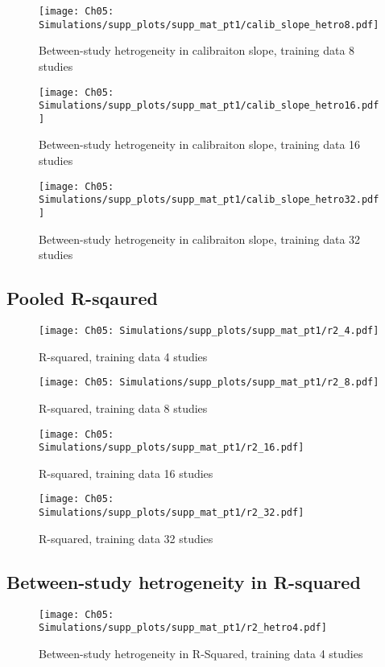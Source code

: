 \begin{figure}[H]
  \centering
  \texttt{[image: Ch05: Simulations/supp\_plots/supp\_mat\_pt1/calib\_slope\_hetro8.pdf]}
  \caption{Between-study hetrogeneity in calibraiton slope, training data 8 studies}
\end{figure}

\begin{figure}[H]
  \centering
  \texttt{[image: Ch05: Simulations/supp\_plots/supp\_mat\_pt1/calib\_slope\_hetro16.pdf]}
  \caption{Between-study hetrogeneity in calibraiton slope, training data 16 studies}
\end{figure}

\begin{figure}[H]
  \centering
  \texttt{[image: Ch05: Simulations/supp\_plots/supp\_mat\_pt1/calib\_slope\_hetro32.pdf]}
  \caption{Between-study hetrogeneity in calibraiton slope, training data 32 studies}
\end{figure}

\subsection{Pooled R-sqaured}
\begin{figure}[H]
  \centering
  \texttt{[image: Ch05: Simulations/supp\_plots/supp\_mat\_pt1/r2\_4.pdf]}
  \caption{R-squared, training data 4 studies}
\end{figure}

\begin{figure}[H]
  \centering
  \texttt{[image: Ch05: Simulations/supp\_plots/supp\_mat\_pt1/r2\_8.pdf]}
  \caption{R-squared, training data 8 studies}
\end{figure}

\begin{figure}[H]
  \centering
  \texttt{[image: Ch05: Simulations/supp\_plots/supp\_mat\_pt1/r2\_16.pdf]}
  \caption{R-squared, training data 16 studies}
\end{figure}

\begin{figure}[H]
  \centering
  \texttt{[image: Ch05: Simulations/supp\_plots/supp\_mat\_pt1/r2\_32.pdf]}
  \caption{R-squared, training data 32 studies}
\end{figure}

\subsection{Between-study hetrogeneity in R-squared}
\begin{figure}[H]
  \centering
  \texttt{[image: Ch05: Simulations/supp\_plots/supp\_mat\_pt1/r2\_hetro4.pdf]}
  \caption{Between-study hetrogeneity in R-Squared, training data 4 studies}
\end{figure}

